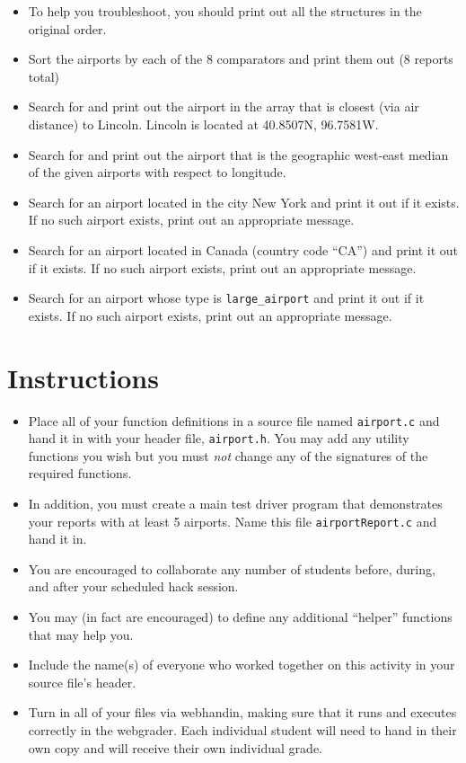 \documentclass[12pt]{scrartcl}
\begin{document}
\begin{itemize}
  \item To help you troubleshoot, you should print out all the structures
  in the original order.
  \item Sort the airports by each of the 8 comparators and print them 
  out (8 reports total)
  \item Search for and print out the airport in the array that is closest (via 
  air distance) to Lincoln.  Lincoln is located at 40.8507N, 96.7581W.
  \item Search for and print out the airport that is the geographic west-east
  median of the given airports with respect to longitude.  
  \item Search for an airport located in the city New York and print it out
  if it exists.  If no such airport exists, print out an appropriate message.
  \item Search for an airport located in Canada (country code ``CA'') and print it out
  if it exists.  If no such airport exists, print out an appropriate message.
  \item Search for an airport whose type is \texttt{large_airport} and
  print it out if it exists.  If no such airport exists, print out an appropriate message.
\end{itemize}

\section*{Instructions}

\begin{itemize}

  \item Place all of your function definitions in a source file named 
  \texttt{airport.c} and hand it in with your header file, 
  \texttt{airport.h}.  You may add any utility functions you
  wish but you must \emph{not} change any of the signatures of the required
  functions.
  
  \item In addition, you must create a main test driver program that 
  demonstrates your reports with at least 5 airports. Name this file 
  \texttt{airportReport.c} and hand it in.

  \item You are encouraged to collaborate any number of students 
  before, during, and after your scheduled hack session.  

  \item You may (in fact are encouraged) to define any additional
  ``helper'' functions that may help you.

  \item Include the name(s) of everyone who worked together on
  this activity in your source file's header.

  \item Turn in all of your files via webhandin, making sure that 
  it runs and executes correctly in the webgrader.  Each individual 
  student will need to hand in their own copy and will receive 
  their own individual grade.
\end{itemize}  
\end{document}
